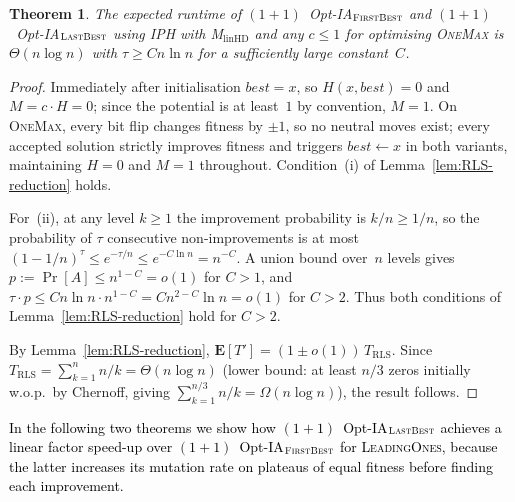\documentclass[lettersize,journal]{IEEEtran}
\newcommand{\new}[1]{\textcolor{black}{#1}}
\newcommand{\linHD}{M$_{\text{linHD}}$}
\newcommand{\IPHfcm}{IPH}
\newcommand{\firstBest}{$(1+1)$~Opt-IA$_{\textsc{FirstBest}}$}
\newcommand{\lastBest}{$(1+1)$~Opt-IA$_{\textsc{LastBest}}$}
\newtheorem{theorem}{Theorem}
\begin{document}
\begin{theorem}\label{thm:onemaxexpo}
The expected runtime of \firstBest{} and \lastBest{} using \IPHfcm{} with
\linHD{} and any $c\leq 1$ for optimising \textsc{OneMax} is $\Theta(n\log n)$
with $\tau\geq Cn\ln n$ for a sufficiently large constant~$C$.
\end{theorem}
\begin{proof}
Immediately after initialisation $\mathit{best}=x$, so $H(x,\mathit{best})=0$
and $M=c\cdot H=0$; since the potential is at least~$1$ by convention, $M=1$.
On \textsc{OneMax}, every bit flip changes fitness by $\pm 1$, so no neutral
moves exist; every accepted solution strictly improves fitness and triggers
$\mathit{best}\leftarrow x$ in both variants, maintaining $H=0$ and $M=1$
throughout.  Condition~(i) of Lemma~\ref{lem:RLS-reduction} holds.

For~(ii), at any level $k\geq 1$ the improvement probability is $k/n\geq 1/n$,
so the probability of $\tau$ consecutive non-improvements is at most
$(1-1/n)^\tau\leq e^{-\tau/n}\leq e^{-C\ln n}=n^{-C}$.
A union bound over~$n$ levels gives $p:=\Pr[A]\leq n^{1-C}=o(1)$ for $C>1$,
and $\tau\cdot p\leq Cn\ln n\cdot n^{1-C}=Cn^{2-C}\ln n=o(1)$ for $C>2$.
Thus both conditions of Lemma~\ref{lem:RLS-reduction} hold for $C>2$.

By Lemma~\ref{lem:RLS-reduction},
$\mathbf{E}[T']=(1\pm o(1))\,T_{\mathrm{RLS}}$.
Since $T_{\mathrm{RLS}}=\sum_{k=1}^{n}n/k=\Theta(n\log n)$ (lower bound: at
least $n/3$ zeros initially w.o.p.\ by Chernoff, giving
$\sum_{k=1}^{n/3}n/k=\Omega(n\log n)$), the result follows.
\end{proof}



\new{In the following two theorems we show how \lastBest{} achieves a linear
factor speed-up over \firstBest{} for \textsc{LeadingOnes}, because the latter
increases its mutation rate on plateaus of equal fitness before finding each
improvement.}
\end{document}
